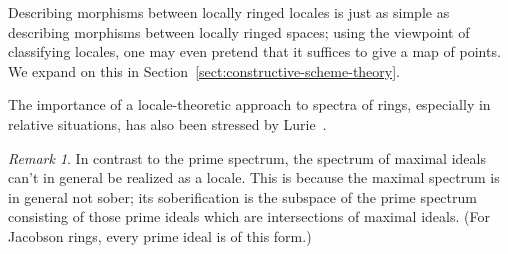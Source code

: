\documentclass[10pt,reqno,a4paper]{amsbook}
\theoremstyle{definition}
\theoremstyle{plain}
\theoremstyle{remark}
\newtheorem{rem}[defn]{Remark}
\newcommand{\?}{\,{:}\,}
\renewcommand{\_}{\mathpunct{.}\,}
\begin{document}
Describing morphisms between locally ringed locales is just as simple as
describing morphisms between locally ringed spaces; using the viewpoint of
classifying locales, one may even pretend that it suffices to give a map of
points. We expand on this in Section~\ref{sect:constructive-scheme-theory}.

The importance of a locale-theoretic approach to spectra of rings, especially in
relative situations, has also been stressed by Lurie~\cite[p.~37]{lurie:dag5}.

\begin{rem}In contrast to the prime spectrum, the spectrum of maximal ideals
can't in general be realized as a locale. This is because the maximal spectrum
is in general not sober; its soberification is the subspace of the prime
spectrum consisting of those prime ideals which are intersections of maximal
ideals. (For Jacobson rings, every prime ideal is of this form.)
\end{rem}
\end{document}
